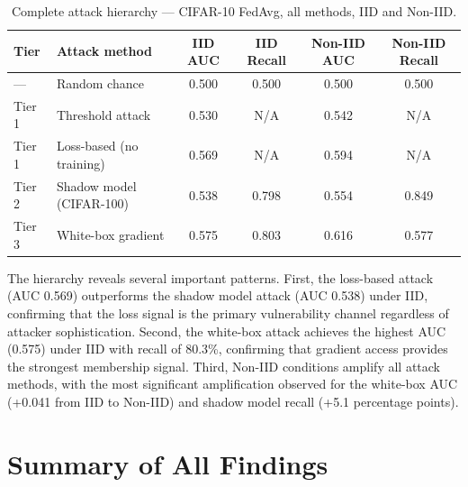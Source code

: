 \documentclass[12pt, a4paper]{report}
\begin{document}
\begin{table}[H]
  \centering
  \caption{Complete attack hierarchy --- CIFAR-10 FedAvg, all methods, IID and Non-IID.}
  \label{tab:full_hierarchy}
  \begin{tabular}{llcccc}
    \toprule
    \textbf{Tier} & \textbf{Attack method} & \textbf{IID AUC} & \textbf{IID Recall} & \textbf{Non-IID AUC} & \textbf{Non-IID Recall} \\
    \midrule
    ---    & Random chance              & 0.500 & 0.500 & 0.500 & 0.500 \\
    \midrule
    Tier 1 & Threshold attack           & 0.530 & N/A   & 0.542 & N/A   \\
    Tier 1 & Loss-based (no training)   & 0.569 & N/A   & 0.594 & N/A   \\
    \midrule
    Tier 2 & Shadow model (CIFAR-100)   & 0.538 & 0.798 & 0.554 & 0.849 \\
    \midrule
    Tier 3 & White-box gradient         & 0.575 & 0.803 & 0.616 & 0.577 \\
    \bottomrule
  \end{tabular}
\end{table}

The hierarchy reveals several important patterns. First, the loss-based attack
(AUC 0.569) outperforms the shadow model attack (AUC 0.538) under IID, confirming
that the loss signal is the primary vulnerability channel regardless of attacker
sophistication. Second, the white-box attack achieves the highest AUC (0.575)
under IID with recall of 80.3\%, confirming that gradient access provides the
strongest membership signal. Third, Non-IID conditions amplify all attack methods,
with the most significant amplification observed for the white-box AUC
(+0.041 from IID to Non-IID) and shadow model recall (+5.1 percentage points).

\section{Summary of All Findings}
\end{document}
